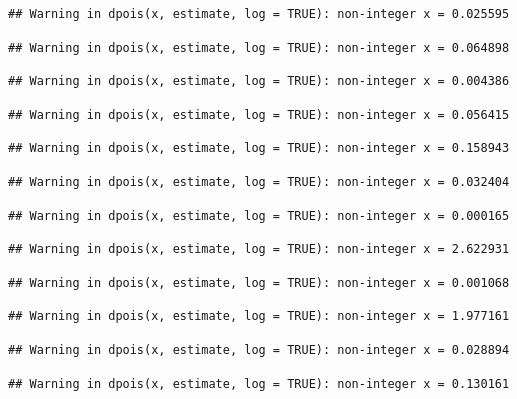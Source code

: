 \documentclass[]{article}
\begin{document}
\begin{verbatim}
## Warning in dpois(x, estimate, log = TRUE): non-integer x = 0.025595
\end{verbatim}

\begin{verbatim}
## Warning in dpois(x, estimate, log = TRUE): non-integer x = 0.064898
\end{verbatim}

\begin{verbatim}
## Warning in dpois(x, estimate, log = TRUE): non-integer x = 0.004386
\end{verbatim}

\begin{verbatim}
## Warning in dpois(x, estimate, log = TRUE): non-integer x = 0.056415
\end{verbatim}

\begin{verbatim}
## Warning in dpois(x, estimate, log = TRUE): non-integer x = 0.158943
\end{verbatim}

\begin{verbatim}
## Warning in dpois(x, estimate, log = TRUE): non-integer x = 0.032404
\end{verbatim}

\begin{verbatim}
## Warning in dpois(x, estimate, log = TRUE): non-integer x = 0.000165
\end{verbatim}

\begin{verbatim}
## Warning in dpois(x, estimate, log = TRUE): non-integer x = 2.622931
\end{verbatim}

\begin{verbatim}
## Warning in dpois(x, estimate, log = TRUE): non-integer x = 0.001068
\end{verbatim}

\begin{verbatim}
## Warning in dpois(x, estimate, log = TRUE): non-integer x = 1.977161
\end{verbatim}

\begin{verbatim}
## Warning in dpois(x, estimate, log = TRUE): non-integer x = 0.028894
\end{verbatim}

\begin{verbatim}
## Warning in dpois(x, estimate, log = TRUE): non-integer x = 0.130161
\end{verbatim}
\end{document}
